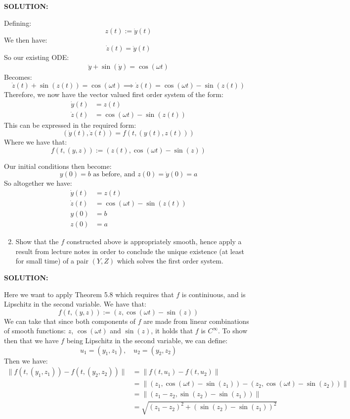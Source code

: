 \documentclass[]{article}
\begin{document}
\noindent \textbf{SOLUTION:}\newline

\noindent Defining:
\[
z(t) := \dot{y}(t)
\]
\noindent We then have:
\[
\dot{z}(t) = \ddot{y}(t)
\]
\noindent So our existing ODE:
\[
\begin{aligned}
    \ddot y + \sin(\dot y) = \cos(\omega t)
\end{aligned}
\]
\noindent Becomes:
\[
\dot{z}(t) + \sin(z(t)) = \cos(\omega t) \implies \dot{z}(t) = \cos(\omega t) - \sin(z(t))
\]
\noindent Therefore, we now have the vector valued first order system of the form:
\[
\begin{aligned}
\dot {y}(t) &= z(t)\\
\dot{z}(t) &= \cos(\omega t) - \sin\left(z(t)\right)
\end{aligned}
\]
\noindent This can be expressed in the required form:
\[
(\dot y(t),\dot z(t))
= f\left(t,(y(t),z(t))\right)
\]
\noindent Where we have that:
\[
f\left(t,(y,z)\right) := \left(z(t),\cos(\omega t) - \sin(z)\right)
\]

\noindent Our initial conditions then become:
\[
y(0)=b \text{ as before, and } z(0) = \dot{y}(0)=a
\]
\noindent So altogether we have:
\[
\begin{aligned}
\dot {y}(t) &= z(t)\\
\dot{z}(t) &= \cos(\omega t) - \sin\left(z(t)\right)\\
y(0)&=b\\
 z(0) &=a
\end{aligned}
\]


\begin{enumerate}
    \setcounter{enumi}{1}
\item Show that the $f$ constructed above is appropriately smooth, hence apply a result from lecture notes in order to conclude the unique existence (at least for small time) of a pair $(Y,Z)$ which solves the first order system.
\end{enumerate}

\noindent\textbf{SOLUTION:}\newline

\noindent Here we want to apply Theorem 5.8 which requires that $f$ is continiuous, and is Lipschitz in the second variable. We have that:
\[
f\left(t,(y,z)\right) := \left(z,\cos(\omega t) - \sin(z)\right)
\]
\noindent We can take that since both components of $f$ are made from linear combinations of smooth functions:  $z$, $\cos(\omega t)$ and $\sin(z)$, it holds that $f$ is $C^{\infty}$. To show then that we have $f$ being Lipschitz in the second variable, we can define:
\[
u_1 = (y_1,z_1),\quad u_2 = (y_2,z_2) 
\]
Then we have:
\begin{align*}
     \|f(t,(y_1,z_1))-f(t,(y_2,z_2) )\| &=    \|f(t,u_1)-f(t,u_2)\|\\
     &= \|(z_1,\cos(\omega t)-\sin(z_1)) - (z_2,\cos(\omega t) - \sin(z_2))\|\\
&=\|(z_1-z_2, \sin(z_2) - \sin(z_1))\|\\
&= \sqrt{(z_1-z_2)^2+(\sin(z_2)-\sin(z_1))^2}
\end{align*}
\end{document}

